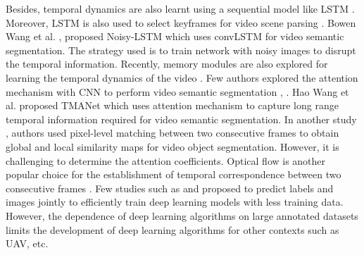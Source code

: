 \documentclass[journal]{IEEEtran}
\begin{document}
Besides, temporal dynamics are also learnt using a sequential model like LSTM \cite{wang2019deep}. Moreover,  LSTM is also used to select keyframes for video scene parsing \cite{16}. Bowen Wang et al. \cite{wang2020noisy}, proposed Noisy-LSTM which uses convLSTM for video semantic segmentation. The strategy used is to train network with noisy images to disrupt the temporal information. Recently, memory modules are also explored for learning the temporal dynamics of the video \cite{paul2021local}. Few authors explored the attention mechanism with CNN to perform video semantic segmentation \cite{27}, \cite{wang2021temporal}. Hao Wang et al. \cite{wang2021temporal} proposed TMANet which uses attention mechanism to capture long range temporal information required for video semantic segmentation. In another study \cite{xuerui2020lsmvos}, authors used pixel-level matching between two consecutive frames to obtain global and local similarity maps for video object segmentation. However, it is challenging to determine the attention coefficients.  Optical flow is another popular choice for the establishment of temporal correspondence between two consecutive frames \cite{25}. Few studies such as \cite{22} and \cite{23} proposed to predict labels and images jointly to efficiently train deep learning models with less training data. However, the dependence of deep learning algorithms on large annotated datasets limits the development of deep learning algorithms for other contexts such as UAV, etc. 
\end{document}
